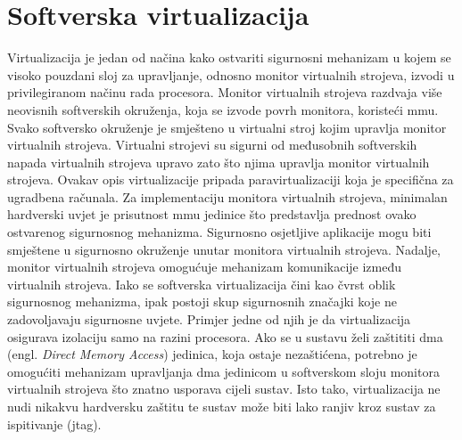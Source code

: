 \documentclass[times, utf8, diplomski, numeric]{fer}
\begin{document}
\section{Softverska virtualizacija}
Virtualizacija je jedan od načina kako ostvariti sigurnosni mehanizam u kojem se visoko pouzdani sloj za upravljanje,
odnosno monitor virtualnih strojeva, izvodi u privilegiranom načinu rada procesora. Monitor virtualnih strojeva razdvaja
više neovisnih softverskih okruženja, koja se izvode povrh monitora, koristeći \gls{mmu}. Svako softversko okruženje je
smješteno u virtualni stroj kojim upravlja monitor virtualnih strojeva. Virtualni strojevi su sigurni od međusobnih softverskih
napada virtualnih strojeva upravo zato što njima upravlja monitor virtualnih strojeva. Ovakav opis virtualizacije pripada
paravirtualizaciji koja je specifična za ugradbena računala. Za implementaciju monitora virtualnih strojeva, minimalan
hardverski uvjet je prisutnost \gls{mmu} jedinice što predstavlja prednost ovako ostvarenog sigurnosnog mehanizma. Sigurnosno
osjetljive aplikacije mogu biti smještene u sigurnosno okruženje unutar monitora virtualnih strojeva. Nadalje, monitor
virtualnih strojeva omogućuje mehanizam komunikacije između virtualnih strojeva. Iako se softverska virtualizacija čini kao
čvrst oblik sigurnosnog mehanizma, ipak postoji skup sigurnosnih značajki koje ne zadovoljavaju sigurnosne uvjete. Primjer
jedne od njih je da virtualizacija osigurava izolaciju samo na razini procesora. Ako se u sustavu želi zaštititi \gls{dma} (engl.
\textit{Direct Memory Access}) jedinica, koja ostaje nezaštićena, potrebno je omogućiti mehanizam upravljanja \gls{dma} jedinicom
u softverskom sloju monitora virtualnih strojeva što znatno usporava cijeli sustav. Isto tako, virtualizacija ne nudi nikakvu
hardversku zaštitu te sustav može biti lako ranjiv kroz sustav za ispitivanje (\gls{jtag}).
\end{document}

